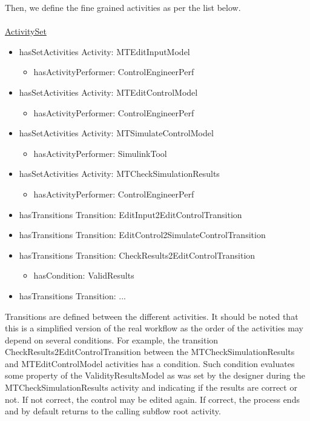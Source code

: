 Then, we define the fine grained activities as per the list below. 
\\
\\
\noindent\uline{ActivitySet}
     \begin{itemize}
    \item hasSetActivities Activity: MTEditInputModel 
        \begin{itemize}
            \item hasActivityPerformer: ControlEngineerPerf
        \end{itemize}
    \item hasSetActivities Activity: MTEditControlModel
        \begin{itemize}
            \item hasActivityPerformer: ControlEngineerPerf
        \end{itemize}
    \item hasSetActivities Activity: MTSimulateControlModel
        \begin{itemize}
            \item hasActivityPerformer: SimulinkTool
        \end{itemize}
    \item hasSetActivities Activity: MTCheckSimulationResults
        \begin{itemize}
            \item hasActivityPerformer: ControlEngineerPerf
        \end{itemize}
    \item hasTransitions Transition: EditInput2EditControlTransition
    \item hasTransitions Transition: EditControl2SimulateControlTransition
    \item hasTransitions Transition: CheckResults2EditControlTransition
        \begin{itemize}
            \item hasCondition: ValidResults
        \end{itemize}
    \item hasTransitions Transition: ...
\end{itemize}

Transitions are defined between the different activities. It should be noted that this is a simplified version of the real workflow as the order of the activities may depend on several conditions. For example, the transition CheckResults2EditControlTransition between the MTCheckSimulationResults and MTEditControlModel activities has a condition. Such condition evaluates some property of the ValidityResultsModel as was set by the designer during the MTCheckSimulationResults activity and indicating if the results are correct or not. If not correct, the control may be edited again. If correct, the process ends and by default returns to the calling subflow root activity.

